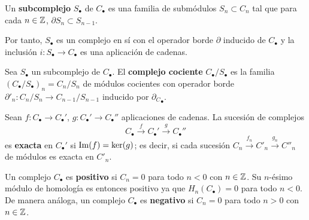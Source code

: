 \begin{definicion}
	Un \textbf{subcomplejo} $S_{\bullet}$ de $C_{\bullet}$ es una familia de submódulos $S_n \subset C_n$ tal que para cada $n \in \mathbb{Z}$, $\partial S_n \subset S_{n-1}$.
\end{definicion}

Por tanto, $S_{\bullet}$ es un complejo en sí con el operador borde $\partial$ inducido de $C_{\bullet}$ y la inclusión $i: S_{\bullet} \rightarrow C_{\bullet}$ es una aplicación de cadenas.

\begin{definicion}
	Sea $S_{\bullet}$ un subcomplejo de $C_{\bullet}$. El \textbf{complejo cociente} $C_{\bullet}/S_{\bullet}$ es la familia $(C_{\bullet}/S_{\bullet})_n = C_n/S_n$ de módulos cocientes con operador borde $\partial'_n: C_n/S_n \rightarrow C_{n-1}/S_{n-1}$ inducido por ${\partial_C}_{\bullet}$.
\end{definicion}

%

\begin{definicion}
Sean \( f: C_{\bullet} \rightarrow C_{\bullet}' \), \( g: C_{\bullet}' \rightarrow C_{\bullet}'' \) aplicaciones de cadenas. La sucesión de complejos \[ C_{\bullet} \xrightarrow{f} C_{\bullet}' \xrightarrow{g} C_{\bullet}'' \] es \textbf{exacta} en \( C_{\bullet}' \) si \( \operatorname{Im}(f) = \ker(g) \); es decir, si cada sucesión \( C_n \xrightarrow{f_n} {C'}_n \xrightarrow{g_n} {C''}_n \) de módulos es exacta en \( {C'}_n \).
\end{definicion}


\begin{definicion}
Un complejo \( C_{\bullet} \) es \textbf{positivo} si \( C_n = 0 \) para todo \( n < 0 \) con $n \in \mathbb{Z}$. Su $n$-ésimo módulo de homología es entonces positivo  ya que \( H_n(C_{\bullet}) = 0 \) para todo \( n < 0 \). De manera análoga, un complejo \( C_{\bullet} \) es \textbf{negativo} si \( C_n = 0 \) para todo \( n > 0 \) con $n \in \mathbb{Z}$.
\end{definicion}


